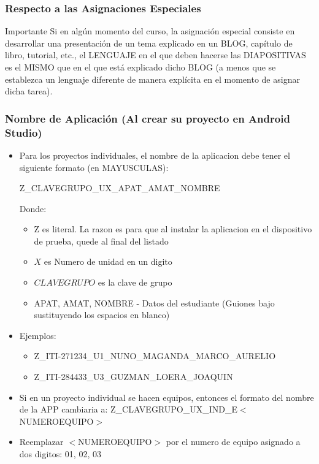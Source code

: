 \begin{frame}
\frametitle{Respecto a las Asignaciones Especiales}

\begin{alertblock}{Importante}
Si en algún momento del curso, la asignación especial consiste en desarrollar una presentación de un tema explicado en un BLOG, capítulo de libro, tutorial, etc., el LENGUAJE en el que deben hacerse las DIAPOSITIVAS es el MISMO que en el que está explicado dicho BLOG (a menos que se establezca un lenguaje diferente de manera explícita en el momento de asignar dicha tarea).
\end{alertblock}



\end{frame}




\begin{frame}
\frametitle{Nombre de Aplicaci\'on (Al crear su proyecto en Android Studio)}
\begin{itemize}
\item Para los proyectos individuales, el nombre de la aplicacion debe tener el siguiente formato (en MAYUSCULAS):

Z\_CLAVEGRUPO\_UX\_APAT\_AMAT\_NOMBRE

Donde:
\begin{itemize}
\item Z es literal. La razon es para que al instalar la aplicacion en el dispositivo de prueba, quede al final del listado
\item $X$ es Numero de unidad en un digito
\item $CLAVEGRUPO$ es la clave de grupo
\item APAT, AMAT, NOMBRE - Datos del estudiante (Guiones bajo sustituyendo los espacios en blanco)
\end{itemize}

\item Ejemplos:
\begin{itemize}
\item Z\_ITI-271234\_U1\_NUNO\_MAGANDA\_MARCO\_AURELIO
\item Z\_ITI-284433\_U3\_GUZMAN\_LOERA\_JOAQUIN
\end{itemize}

\end{itemize}



\end{frame}

\begin{frame}
\begin{itemize}

\item Si en un proyecto individual se hacen equipos, entonces el formato del nombre de la APP cambiaria a:
Z\_CLAVEGRUPO\_UX\_IND\_E$<$NUMEROEQUIPO$>$
\item Reemplazar $<$NUMEROEQUIPO$>$ por el numero de equipo asignado a dos digitos: 01, 02, 03
\end{itemize}

\end{frame}



